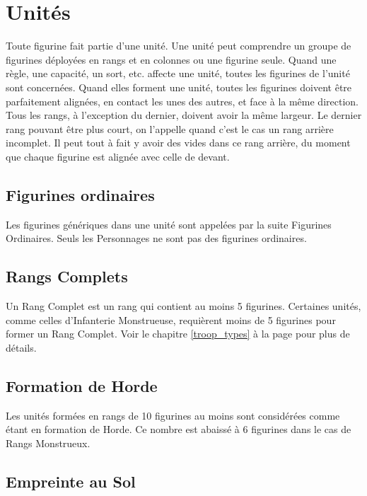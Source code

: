 \section{Unités}

Toute figurine fait partie d'une unité. Une unité peut comprendre un groupe de figurines déployées en rangs et en colonnes ou une figurine seule. Quand une règle, une capacité, un sort, etc. affecte une unité, toutes les figurines de l'unité sont concernées. Quand elles forment une unité, toutes les figurines doivent être parfaitement alignées, en contact les unes des autres, et face à la même direction. Tous les rangs, à l'exception du dernier, doivent avoir la même largeur. Le dernier rang pouvant être plus court, on l'appelle quand c'est le cas un rang arrière incomplet. Il peut tout à fait y avoir des vides dans ce rang arrière, du moment que chaque figurine est alignée avec celle de devant.

\subsection{Figurines ordinaires}

Les figurines génériques dans une unité sont appelées par la suite Figurines Ordinaires. Seuls les Personnages ne sont pas des figurines ordinaires.

\subsection{Rangs Complets}

Un Rang Complet est un rang qui contient au moins 5 figurines. Certaines unités, comme celles d'Infanterie Monstrueuse, requièrent moins de 5 figurines pour former un Rang Complet. Voir le chapitre \ref{troop_types} à la page \pageref{troop_types} pour plus de détails.

\subsection{Formation de Horde}
\label{horde}

Les unités formées en rangs de 10 figurines au moins sont considérées comme étant en formation de Horde. Ce nombre est abaissé à 6 figurines dans le cas de Rangs Monstrueux.

\subsection{Empreinte au Sol}


